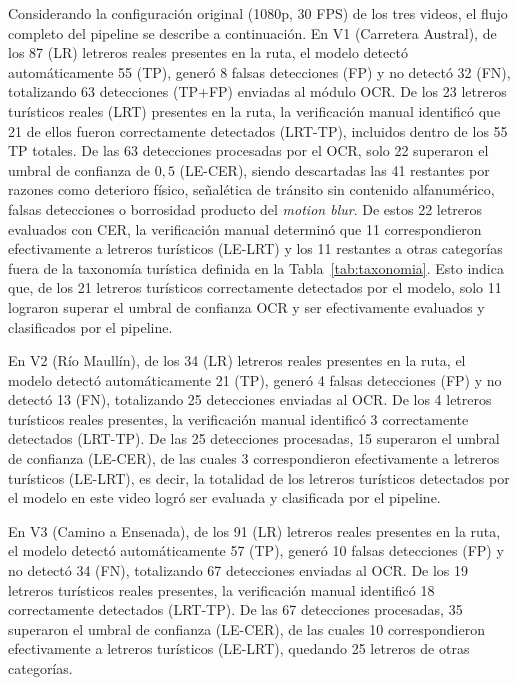 \documentclass[runningheads]{llncs}
\begin{document}
Considerando la configuración original (1080p, 30 FPS) de los tres 
videos, el flujo completo del pipeline se describe a continuación. 
En V1 (Carretera Austral), de los 87 (LR) letreros reales presentes en la 
ruta, el modelo detectó automáticamente 55 (TP), generó 8 falsas 
detecciones (FP) y no detectó 32 (FN), totalizando 63 detecciones 
(TP+FP) enviadas al módulo OCR. De los 23 letreros turísticos reales 
(LRT) presentes en la ruta, la verificación manual identificó que 21 
de ellos fueron correctamente detectados (LRT-TP), incluidos dentro 
de los 55 TP totales. De las 63 detecciones procesadas por el OCR, 
solo 22 superaron el umbral de confianza de $0,5$ (LE-CER), siendo 
descartadas las 41 restantes por razones como deterioro físico, 
señalética de tránsito sin contenido alfanumérico, falsas detecciones 
o borrosidad producto del \textit{motion blur}. De estos 22 letreros 
evaluados con CER, la verificación manual determinó que 11 
correspondieron efectivamente a letreros turísticos (LE-LRT) y los 11 
restantes a otras categorías fuera de la taxonomía turística definida 
en la Tabla~\ref{tab:taxonomia}. Esto indica que, de los 21 letreros 
turísticos correctamente detectados por el modelo, solo 11 lograron 
superar el umbral de confianza OCR y ser efectivamente evaluados y 
clasificados por el pipeline.

En V2 (Río Maullín), de los 34 (LR) letreros reales presentes en la ruta, 
el modelo detectó automáticamente 21 (TP), generó 4 falsas 
detecciones (FP) y no detectó 13 (FN), totalizando 25 detecciones 
enviadas al OCR. De los 4 letreros turísticos reales presentes, la 
verificación manual identificó 3 correctamente detectados (LRT-TP). 
De las 25 detecciones procesadas, 15 superaron el umbral de confianza 
(LE-CER), de las cuales 3 correspondieron efectivamente a letreros 
turísticos (LE-LRT), es decir, la totalidad de los letreros 
turísticos detectados por el modelo en este video logró ser evaluada 
y clasificada por el pipeline.

En V3 (Camino a Ensenada), de los 91 (LR) letreros reales presentes en la 
ruta, el modelo detectó automáticamente 57 (TP), generó 10 falsas 
detecciones (FP) y no detectó 34 (FN), totalizando 67 detecciones 
enviadas al OCR. De los 19 letreros turísticos reales presentes, la 
verificación manual identificó 18 correctamente detectados (LRT-TP). 
De las 67 detecciones procesadas, 35 superaron el umbral de confianza 
(LE-CER), de las cuales 10 correspondieron efectivamente a letreros 
turísticos (LE-LRT), quedando 25 letreros de otras categorías.
\end{document}
